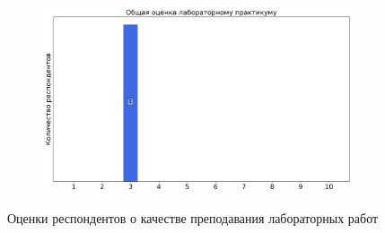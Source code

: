 \begin{figure}[H]
\begin{subfigure}[b]{0.45\textwidth}
			\end{subfigure}
			\begin{subfigure}[b]{0.45\textwidth}
				\centering
				\includegraphics[width=\textwidth]{images/3 course/Аналоговая электроника/labniks-marks-Иващенко А.А.-3.png}
			\end{subfigure}	
			\caption{Оценки респондентов о качестве преподавания лабораторных работ}
		\end{figure}


